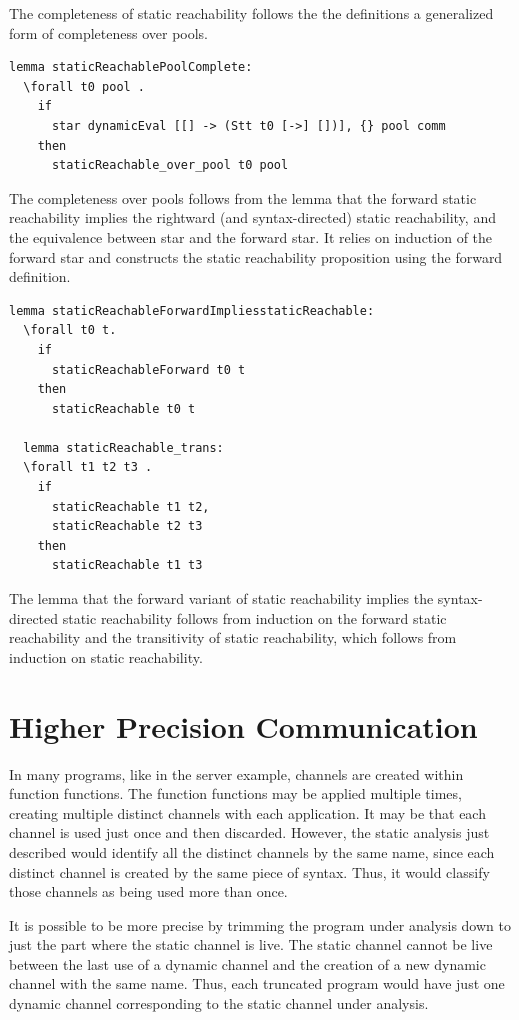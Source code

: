\documentclass[10pt]{article}
\begin{document}
The completeness of static reachability follows the the definitions
a generalized form of completeness over pools.

\begin{lstlisting}[language=logic, mathescape]
  lemma staticReachablePoolComplete:
  \forall t0 pool .
    if
      star dynamicEval [[] -> (Stt t0 [->] [])], {} pool comm 
    then
      staticReachable_over_pool t0 pool
\end{lstlisting}

The completeness over pools follows from the lemma that the forward
static reachability implies the rightward (and syntax-directed) static reachability,
and the equivalence between star and the forward star.  It relies on induction of the
forward star and constructs the static reachability
proposition using the forward definition.  

\begin{lstlisting}[language=logic, mathescape]
  lemma staticReachableForwardImpliesstaticReachable:
  \forall t0 t. 
    if
      staticReachableForward t0 t
    then
      staticReachable t0 t

  lemma staticReachable_trans:
  \forall t1 t2 t3 .
    if 
      staticReachable t1 t2,
      staticReachable t2 t3
    then
      staticReachable t1 t3
\end{lstlisting}

The lemma that the forward variant of static reachability implies the syntax-directed static
reachability follows from induction on the forward static reachability and the
transitivity of static reachability, which follows from induction on static reachability.

\section{Higher Precision Communication}
In many programs, like in the server example, channels are created within function functions.
The function functions may be applied multiple times, creating multiple distinct channels
with each application. It may be that each channel is used just once and then discarded.
However, the static analysis just described would identify all the distinct channels by the
same name, since each distinct channel is created by the same piece of syntax.
Thus, it would classify those channels as being used more than once.

It is possible to be more precise by trimming the program under analysis down to just the part
where the static channel is live. The static channel cannot be live between the last use of a
dynamic channel and the creation of a new dynamic channel with the same name.  Thus, each
truncated program would have just one dynamic channel corresponding to the static channel under
analysis. 
\end{document}
